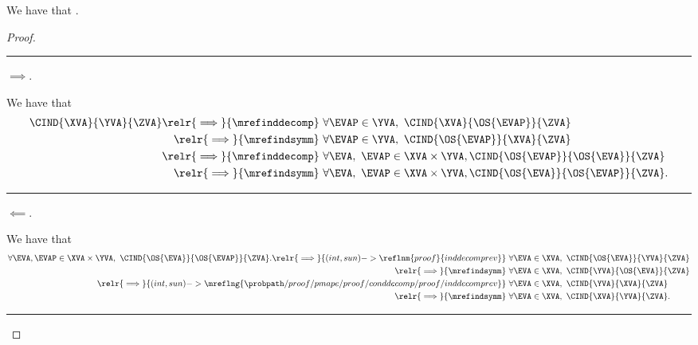 \begin{proposition}
  We have that \conddecompdef.%
\end{proposition}

\begin{proof}
  \hrule
  $\implies$.

  We have that 
  \begin{align*}
    \CIND{\XVA}{\YVA}{\ZVA} 
    \relr {\implies} {\mrefinddecomp} &\ \forall \EVAP \in \YVA,\ \CIND{\XVA}{\OS{\EVAP}}{\ZVA} \\
    \relr {\implies} {\mrefindsymm} &\ \forall \EVAP \in \YVA,\ \CIND{\OS{\EVAP}}{\XVA}{\ZVA} \\
    \relr {\implies} {\mrefinddecomp} &\ \forall \EVA,\ \EVAP \in \XVA\times\YVA, \CIND{\OS{\EVAP}}{\OS{\EVA}}{\ZVA}\\
    \relr {\implies} {\mrefindsymm} &\ \forall \EVA,\ \EVAP \in \XVA \times \YVA, \CIND{\OS{\EVA}}{\OS{\EVAP}}{\ZVA}.
  \end{align*}

  \hrule
  $\impliedby$.

  We have that 
  \begin{align*}
    \forall \EVA, \EVAP \in \XVA \times \YVA,\ \CIND{\OS{\EVA}}{\OS{\EVAP}}{\ZVA}.
    \relr {\implies} {(int,sun)->\reflnm{proof}{inddecomprev}} &\ \forall \EVA \in \XVA,\ \CIND{\OS{\EVA}}{\YVA}{\ZVA}\\
    \relr {\implies} {\mrefindsymm} &\ \forall \EVA \in \XVA,\ \CIND{\YVA}{\OS{\EVA}}{\ZVA}\\
    \relr {\implies} {(int,sun)->\mreflng{\probpath/proof/pmape/proof/conddecomp/proof/inddecomprev}} &\ \forall \EVA \in \XVA,\ \CIND{\YVA}{\XVA}{\ZVA}\\
    \relr {\implies} {\mrefindsymm} &\ \forall \EVA \in \XVA,\ \CIND{\XVA}{\YVA}{\ZVA}.
  \end{align*}
  \hrule
\end{proof}
